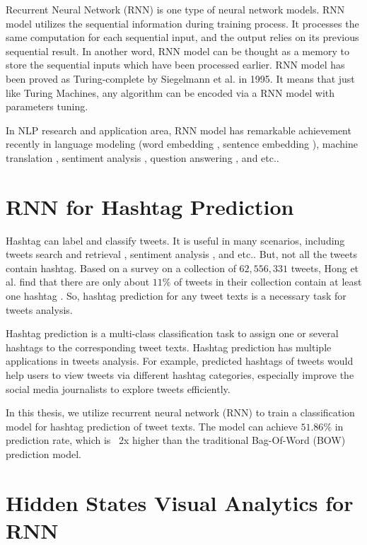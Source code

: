 Recurrent Neural Network (RNN) is one type of neural network models. RNN model utilizes the sequential information during training process. It processes the same computation for each sequential input, and the output relies on its previous sequential result. In another word, RNN model can be thought as a memory to store the sequential inputs which have been processed earlier.  RNN model has been proved as Turing-complete by Siegelmann et al.\cite{Siegelmann1995} in 1995. It means that just like Turing Machines, any algorithm can be encoded via a RNN model with parameters tuning. 

In NLP research and application area, RNN model has remarkable achievement recently in language modeling (word embedding \cite{Mikolov2013}, sentence embedding \cite{Kiros2015}), machine translation \cite{Sutskever2014}, sentiment analysis \cite{Socher2013}, question answering \cite{Iyyer2014}, and etc.. 

\section{RNN for Hashtag Prediction}

Hashtag can label and classify tweets. It is useful in many scenarios, including tweets search and retrieval \cite{Efron2010}, sentiment analysis \cite{Davidov2010}, and etc.. But, not all the tweets contain hashtag. Based on a survey on a collection of $62,556,331$ tweets, Hong et al. find that there are only about $11\%$ of tweets in their collection contain at least one hashtag \cite{Hong2011a}. So, hashtag prediction for any tweet texts is a necessary task for tweets analysis. 

Hashtag prediction is a multi-class classification task to assign one or several hashtags to the corresponding tweet texts. Hashtag prediction has multiple applications in tweets analysis.  For example, predicted hashtags of tweets would help users to view tweets via different hashtag categories, especially improve the social media journalists to explore tweets efficiently. 

In this thesis, we utilize recurrent neural network (RNN) to train a classification model for hashtag prediction of tweet texts. The model can achieve $51.86\%$ in prediction rate, which is ~2x higher than the traditional Bag-Of-Word (BOW) prediction model.

\section{Hidden States Visual Analytics for RNN}

